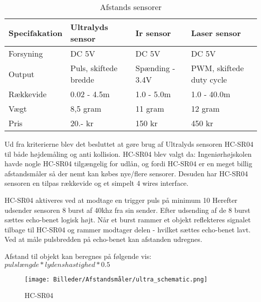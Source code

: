\raggedright
\newpage

\begin{table}[H]
	\centering
		\begin{tabular}{|p{2.8cm}|p{3.4 cm}|p{3.4 cm}|p{3.4 cm}|} 
		\hline
			\textbf{Specifakation} 	& \textbf{Ultralyds sensor} 	& \textbf{Ir sensor} 		& \textbf{Laser sensor} \\ \hline
			 Forsyning 				& DC 5V 						& DC 5V 					& DC 5V \\ \hline			 
			 Output 				& Puls, \newline skiftede bredde 		& Spænding \newline 1.4 - 3.4V 		& PWM, \newline skiftede duty cycle\\ \hline
			 Rækkevide 					& 0.02 - 4.5m 					& 1.0 - 5.0m 				& 1.0 - 40.0m \\ \hline
			 Vægt 					& 8,5 gram 						& 11 gram 					& 12 gram \\ \hline
		 	 Pris 					& 20.- kr 						& 150 kr 					& 450 kr \\ \hline			 
		\end{tabular}
	\caption{Afstands sensorer}
	\label{tab:Afstands_sensorer}
\end{table}

\vspace{1cm}

Ud fra kriterierne blev det besluttet at gøre brug af Ultralyds sensoren HC-SR04 til både højdemåling og anti kollision. HC-SR04 blev valgt da: Ingeniørhøjskolen havde nogle HC-SR04 tilgængelig for udlån, og fordi HC-SR04 er en meget billig afstandsmåler så der nemt kan købes nye/flere sensorer. Desuden har HC-SR04 sensoren en tilpas rækkevide og et simpelt 4 wires interface. 

HC-SR04 aktiveres ved at modtage en trigger puls på minimum 10 
Herefter udsender sensoren 8 burst af 40khz fra sin sender. Efter udsending af de 8 burst sættes echo-benet logisk højt. Når et burst rammer et objekt reflekteres signalet tilbage til HC-SR04 og rammer modtager delen - hvilket sættes echo-benet lavt. Ved at måle pulsbredden på echo-benet kan afstanden udregnes. 

Afstand til objekt kan beregnes på følgende vis: $pulslængde * lydenshastighed * 0.5$



\begin{figure}[H]
\centering
\texttt{[image: Billeder/Afstandsmåler/ultra\_schematic.png]}
\caption{HC-SR04}
\label{fig:HC-SR04}
\end{figure}










